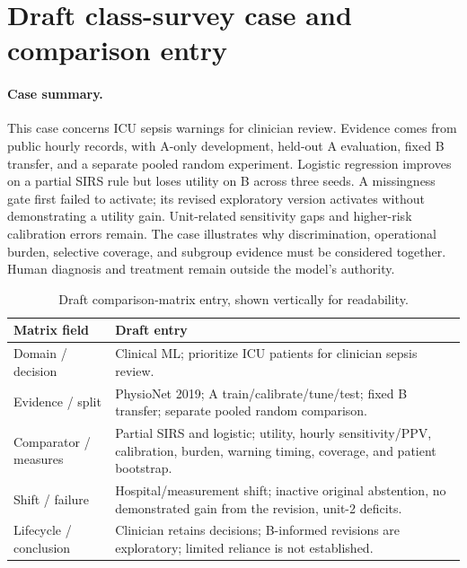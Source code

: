 \documentclass{article}
\begin{document}
\newpage
\section{Draft class-survey case and comparison entry}
\paragraph{Case summary.}
This case concerns ICU sepsis warnings for clinician review. Evidence comes from public hourly records, with A-only development, held-out A evaluation, fixed B transfer, and a separate pooled random experiment. Logistic regression improves on a partial SIRS rule but loses utility on B across three seeds. A missingness gate first failed to activate; its revised exploratory version activates without demonstrating a utility gain. Unit-related sensitivity gaps and higher-risk calibration errors remain. The case illustrates why discrimination, operational burden, selective coverage, and subgroup evidence must be considered together. Human diagnosis and treatment remain outside the model's authority.

\begin{table}[h]
\centering\small
\begin{tabularx}{\linewidth}{@{}p{.21\linewidth}X@{}}
\toprule
Matrix field & Draft entry\\
\midrule
Domain / decision & Clinical ML; prioritize ICU patients for clinician sepsis review.\\
Evidence / split & PhysioNet 2019; A train/calibrate/tune/test; fixed B transfer; separate pooled random comparison.\\
Comparator / measures & Partial SIRS and logistic; utility, hourly sensitivity/PPV, calibration, burden, warning timing, coverage, and patient bootstrap.\\
Shift / failure & Hospital/measurement shift; inactive original abstention, no demonstrated gain from the revision, unit-2 deficits.\\
Lifecycle / conclusion & Clinician retains decisions; B-informed revisions are exploratory; limited reliance is not established.\\
\bottomrule
\end{tabularx}
\caption{Draft comparison-matrix entry, shown vertically for readability.}
\end{table}
\end{document}
